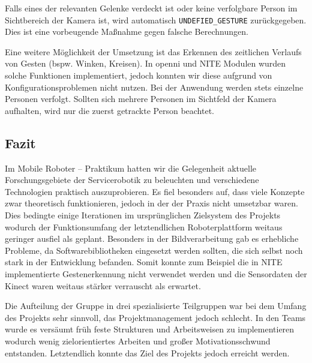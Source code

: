 Falls eines der relevanten Gelenke verdeckt ist oder keine verfolgbare Person im
Sichtbereich der Kamera ist, wird automatisch \lstinline{UNDEFIED_GESTURE}
zurückgegeben. Dies ist eine vorbeugende Maßnahme gegen falsche Berechnungen.

Eine weitere Möglichkeit der Umsetzung ist das Erkennen des zeitlichen Verlaufs von Gesten (bspw. Winken, Kreisen).
 In \gls{openni} und NITE Modulen wurden solche Funktionen implementiert, jedoch konnten wir diese aufgrund von Konfigurationsproblemen nicht nutzen.
Bei der Anwendung werden stets einzelne Personen verfolgt. Sollten sich mehrere Personen im Sichtfeld der Kamera aufhalten, wird nur die zuerst getrackte Person beachtet.

\subsection{Fazit}
Im Mobile Roboter -- Praktikum hatten wir die Gelegenheit aktuelle
 Forschungsgebiete der Servicerobotik zu beleuchten und verschiedene
 Technologien praktisch auszuprobieren. Es fiel besonders auf, dass viele Konzepte zwar theoretisch funktionieren,
 jedoch in der der Praxis nicht umsetzbar waren. Dies bedingte einige Iterationen im ursprünglichen Zielsystem des Projekts
 wodurch der Funktionsumfang der letztendlichen Roboterplattform weitaus geringer ausfiel als geplant.
 Besonders in der Bildverarbeitung gab es erhebliche Probleme, da Softwarebibliotheken eingesetzt werden sollten,
 die sich selbst noch stark in der Entwicklung befanden. Somit konnte zum Beispiel die in NITE implementierte Gestenerkennung
 nicht verwendet werden und die Sensordaten der Kinect waren weitaus stärker verrauscht als erwartet.
 
Die Aufteilung der Gruppe in drei spezialisierte Teilgruppen war bei dem Umfang des Projekts sehr sinnvoll,
 das Projektmanagement jedoch schlecht. In den Teams wurde es versäumt früh feste Strukturen und Arbeitsweisen zu implementieren wodurch
 wenig zielorientiertes Arbeiten und großer Motivationsschwund entstanden. Letztendlich konnte das Ziel des Projekts jedoch erreicht werden.
